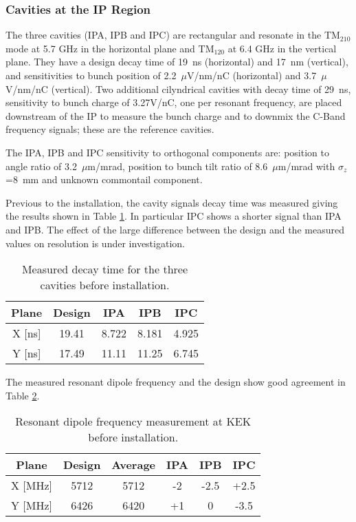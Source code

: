 \subsubsection{Cavities at the IP Region}\label{s:IPBPMsignals}
The three cavities (IPA, IPB and IPC) are rectangular and resonate in the TM$_{210}$ mode at 5.7 GHz in the horizontal plane and TM$_{120}$ at 6.4 GHz in the vertical plane. They have a design decay time of 19~ns (horizontal) and 17~nm (vertical), and sensitivities to bunch position of 2.2~$\mu$V/nm/nC (horizontal) and 3.7~$\mu$V/nm/nC (vertical). Two additional cilyndrical cavities with decay time of 29~ns, sensitivity to bunch charge of 3.27V/nC, one per resonant frequency, are placed downstream of the IP to measure the bunch charge and to downmix the C-Band frequency signals; these are the reference cavities.\par
The IPA, IPB and IPC sensitivity to orthogonal components are: position to angle ratio of 3.2~$\mu$m/mrad, position to bunch tilt  ratio of 8.6~$\mu$m/mrad with $\sigma_z$=8~mm and unknown commontail component.\par
Previous to the installation, the cavity signals decay time was measured giving the results shown in Table \ref{t:decayt}. In particular IPC shows a shorter signal than IPA and IPB. The effect of the large difference between the design and the measured values on resolution is under investigation.\par
\begin{table}[h]
\centering
\begin{tabular}{c|c||c|c|c}\hline
 Plane & Design & IPA & IPB & IPC \\\hline\hline
  X [ns] & 19.41 & 8.722 & 8.181 & 4.925\\
  Y [ns] & 17.49 & 11.11 & 11.25 & 6.745\\\hline
\end{tabular}\caption{Measured decay time for the three cavities before installation.}\label{t:decayt}
\end{table}
The measured resonant dipole frequency and the design show good agreement in Table \ref{t:dipolefreq}.
\begin{table}[h]
\centering
\begin{tabular}{c|c||c|c|c|c}\hline
 Plane & Design & Average & IPA & IPB & IPC \\\hline\hline
  X [MHz] & 5712 & 5712 & -2 & -2.5 & +2.5\\
  Y [MHz] & 6426 & 6420 & +1 & 0 & -3.5\\\hline
\end{tabular}\caption{Resonant dipole frequency measurement at KEK before installation.}\label{t:dipolefreq}
\end{table}

